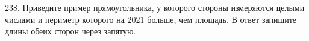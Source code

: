 238. Приведите пример прямоугольника, у которого стороны измеряются целыми числами и периметр которого на 2021 больше, чем площадь. В ответ запишите длины обеих сторон через запятую.\\
